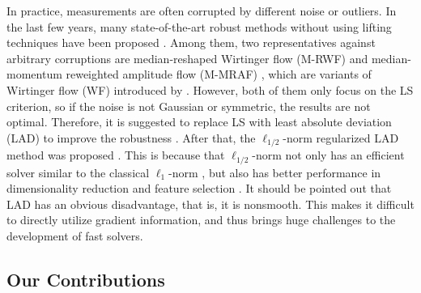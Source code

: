 \documentclass{article}
\numberwithin{equation}{section}
\begin{document}
In practice, measurements are often corrupted by different noise or outliers. In the last few years, many state-of-the-art robust methods without using lifting techniques have been proposed \cite{2016,ZhangHuishuai2018Median,2021Median,2020Robust,kong20221}. Among them, two representatives against arbitrary corruptions are median-reshaped Wirtinger flow (M-RWF) \cite{ZhangHuishuai2018Median} and median-momentum reweighted amplitude flow (M-MRAF) \cite{2021Median}, which are variants of Wirtinger flow (WF) introduced by \cite{candesWF}.
However, both of them only focus on the LS criterion, so if the noise is not Gaussian or symmetric, the results are not optimal.
Therefore, it is suggested to replace LS with least absolute deviation (LAD) to improve the robustness \cite{weller15}.
After that, the $\ell_{1/2}$-norm regularized LAD method was proposed \cite{kong20221}. This is because that $\ell_{1/2}$-norm not only has an efficient solver similar to the classical $\ell_1$-norm \cite{2012L}, but also has better performance in dimensionality reduction and feature selection \cite{li2021sparse,li2025enhanced,chao2025efficient}. 
It should be pointed out that LAD has an obvious disadvantage, that is, it is nonsmooth. This makes it difficult to directly utilize gradient information, and thus brings huge challenges to the development of fast solvers.


	
\subsection{Our Contributions}
\end{document}
